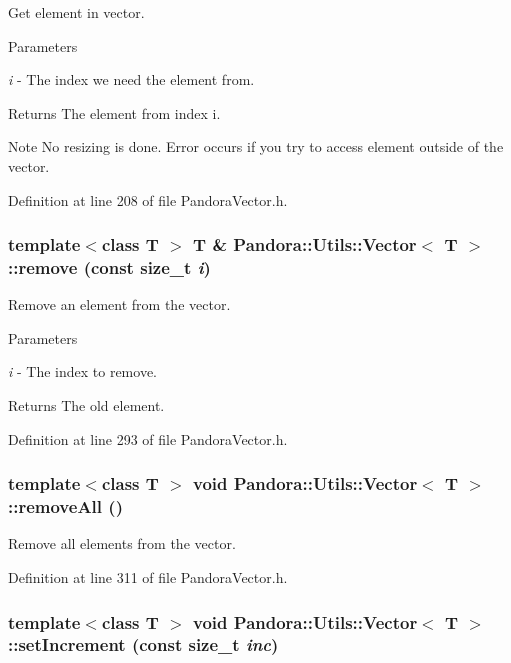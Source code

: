 Get element in vector. 
\begin{DoxyParams}{Parameters}
\item[{\em i}]-\/ The index we need the element from. \end{DoxyParams}
\begin{DoxyReturn}{Returns}
The element from index i. 
\end{DoxyReturn}
\begin{DoxyNote}{Note}
No resizing is done. Error occurs if you try to access element outside of the vector. 
\end{DoxyNote}


Definition at line 208 of file PandoraVector.h.\hypertarget{classPandora_1_1Utils_1_1Vector_a321442d5b814dd8709319ad109af1700}{
\subsubsection[{remove}]{\setlength{\rightskip}{0pt plus 5cm}template$<$class T $>$ T \& {\bf Pandora::Utils::Vector}$<$ T $>$::remove (const size\_\-t {\em i})}}
\label{classPandora_1_1Utils_1_1Vector_a321442d5b814dd8709319ad109af1700}


Remove an element from the vector. 
\begin{DoxyParams}{Parameters}
\item[{\em i}]-\/ The index to remove. \end{DoxyParams}
\begin{DoxyReturn}{Returns}
The old element. 
\end{DoxyReturn}


Definition at line 293 of file PandoraVector.h.\hypertarget{classPandora_1_1Utils_1_1Vector_ab9f631b7ca468cba7f358ee14043b0a6}{
\subsubsection[{removeAll}]{\setlength{\rightskip}{0pt plus 5cm}template$<$class T $>$ void {\bf Pandora::Utils::Vector}$<$ T $>$::removeAll ()}}
\label{classPandora_1_1Utils_1_1Vector_ab9f631b7ca468cba7f358ee14043b0a6}


Remove all elements from the vector. 

Definition at line 311 of file PandoraVector.h.\hypertarget{classPandora_1_1Utils_1_1Vector_a7712e06b6660e77796a6d4093d949e8e}{
\subsubsection[{setIncrement}]{\setlength{\rightskip}{0pt plus 5cm}template$<$class T $>$ void {\bf Pandora::Utils::Vector}$<$ T $>$::setIncrement (const size\_\-t {\em inc})}}
\label{classPandora_1_1Utils_1_1Vector_a7712e06b6660e77796a6d4093d949e8e}


